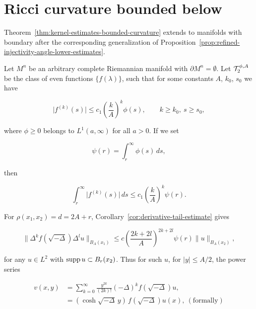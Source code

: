 \chapter{Ricci curvature bounded below}

Theorem~\ref{thm:kernel-estimates-bounded-curvature} extends to manifolds with boundary after the corresponding
generalization of Proposition~\ref{prop:refined-injectivity-angle-lower-estimates}.

Let $M^n$ be an arbitrary complete Riemannian manifold with $\partial M^n = \emptyset$.
Let $\mathcal{T}_2^{\phi,A}$ be the class of even functions $\{f(\lambda)\}$, such that for some constants
$A$, $k_0$, $s_0$ we have

\begin{equation}\tag{2.1}
\bigl|f^{(k)}(s)\bigr| \le c_1\left(\frac{k}{A}\right)^k \phi(s),\qquad k \ge k_0,\ s \ge s_0,
\end{equation}

where $\phi \ge 0$ belongs to $L^1(a,\infty)$ for all $a > 0$. If we set

\begin{equation}\tag{2.2}
\psi(r) = \int_r^\infty \phi(s)\,ds,
\end{equation}

then

\begin{equation}\tag{2.3}
\int_r^\infty \bigl|f^{(k)}(s)\bigr|\,ds \le c_1\left(\frac{k}{A}\right)^k \psi(r).
\end{equation}

For $\rho(x_1,x_2)=d=2A+r$, Corollary~\ref{cor:derivative-tail-estimate} gives

\begin{equation}\tag{2.4}
\bigl\|\Delta^k f(\sqrt{-\Delta})\Delta^l u\bigr\|_{B_A(x_1)}
\le c\left(\frac{2k + 2l}{A}\right)^{2k+2l}\psi(r)\|u\|_{B_A(x_2)},
\end{equation}

for any $u \in L^2$ with $\operatorname{supp} u \subset B_r(x_2)$. Thus for such $u$, for $|y| \le A/2$, the
power series

\begin{equation}\tag{2.5}
\begin{aligned}
v(x,y) &= \sum_{k=0}^\infty \frac{y^{2k}}{(2k)!}(-\Delta)^k f(\sqrt{-\Delta})u,\\
&= (\cosh \sqrt{-\Delta}\, y)\,f(\sqrt{-\Delta})u(x),\ (\mathrm{formally})
\end{aligned}
\end{equation}

